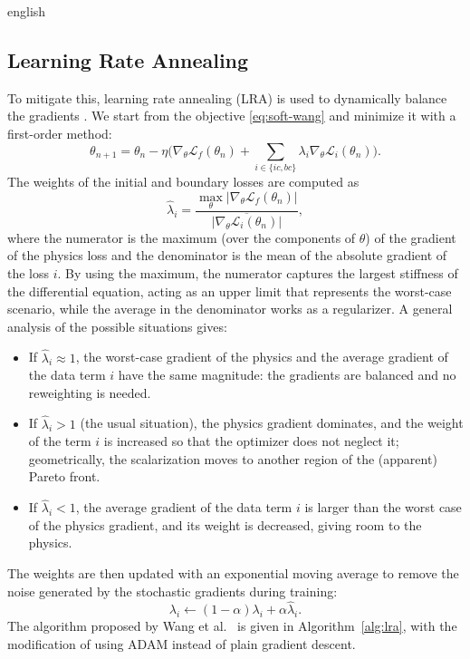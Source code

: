 \documentclass[12pt,letterpaper,twoside]{book}
\newcommand{\abs}[1]{\left\lvert #1 \right\rvert}
\newcommand{\Loss}{\mathcal{L}}
\newif\ifreviewmode
\newcommand{\revtag}[2]{\ifreviewmode{\color{red!70!black}\textsf{\footnotesize[#1#2]}}\fi}
\newcommand{\verificar}[1]{\revtag{VERIFICAR}{: #1}}
\begin{document}
\begin{hyphenrules}{english}
\subsection{Learning Rate Annealing}\label{subsec:lra}

To mitigate this, learning rate annealing (LRA) is used to dynamically balance the gradients
\cite{wang2021gradient}. We start from the objective \eqref{eq:soft-wang} and minimize it with a
first-order method:
\begin{equation}
  \theta_{n+1}=\theta_n-\eta\Big(\nabla_\theta\Loss_f(\theta_n)+\sum_{i\in\{ic,bc\}}\lambda_i\nabla_\theta\Loss_i(\theta_n)\Big).
  \label{eq:lra-update}
\end{equation}
The weights of the initial and boundary losses are computed as
\begin{equation}
  \hat\lambda_i=\frac{\max_\theta\abs{\nabla_\theta\Loss_f(\theta_n)}}{\overline{\abs{\nabla_\theta\Loss_i(\theta_n)}}},
  \label{eq:lra-weights}
\end{equation}
where the numerator is the maximum (over the components of $\theta$) of the gradient of the physics loss
and the denominator is the mean of the absolute gradient of the loss $i$.\verificar{whether the
denominator includes $\lambda_i$, as in the original Algorithm~1} By using the maximum, the numerator
captures the largest stiffness of the differential equation, acting as an upper limit that represents the
worst-case scenario, while the average in the denominator works as a regularizer. A general analysis of
the possible situations gives:
\begin{itemize}
  \item If $\hat\lambda_i\approx1$, the worst-case gradient of the physics and the average gradient of
    the data term $i$ have the same magnitude: the gradients are balanced and no reweighting is needed.
  \item If $\hat\lambda_i>1$ (the usual situation), the physics gradient dominates, and the weight of
    the term $i$ is increased so that the optimizer does not neglect it; geometrically, the
    scalarization moves to another region of the (apparent) Pareto front.
  \item If $\hat\lambda_i<1$, the average gradient of the data term $i$ is larger than the worst case of
    the physics gradient, and its weight is decreased, giving room to the physics.
\end{itemize}
The weights are then updated with an exponential moving average to remove the noise generated by the
stochastic gradients during training:
\begin{equation}
  \lambda_i\leftarrow(1-\alpha)\lambda_i+\alpha\hat\lambda_i.
  \label{eq:lra-ema}
\end{equation}
The algorithm proposed by Wang et al.~\cite{wang2021gradient} is given in Algorithm~\ref{alg:lra}, with the modification
of using ADAM instead of plain gradient descent.


\end{hyphenrules}
\end{document}
